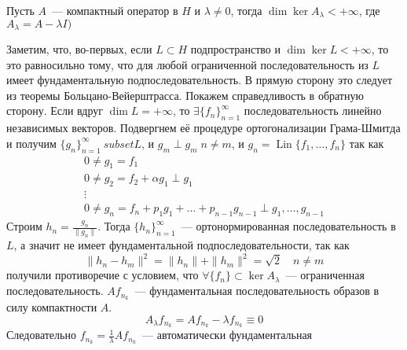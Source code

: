 \documentclass[12pt]{article}
\DeclareMathOperator{\Lin}{Lin}
\begin{document}
\begin{Theor}
    Пусть $A$~--- компактный оператор в $H$ и $\lambda \ne 0$, тогда
    $\dim \ker A_\lambda < +\infty$, где $A_\lambda = A - \lambda I)$
\end{Theor}
\begin{Proof}
    Заметим, что, во-первых, если $L \subset H$ подпространство и $\dim \ker L
    < +\infty$, то это равносильно тому, что для любой ограниченной
    последовательность из $L$ имеет фундаментальную подпоследовательность.
    В прямую сторону это следует из теоремы Больцано-Вейерштрасса.
    Покажем справедливость в обратную сторону.
    Если вдруг $\dim L = +\infty$, то $\exists\{f_n\}_{n = 1}^\infty$
    последовательность линейно независимых векторов.
    Подвергнем её процедуре ортогонализации Грама-Шмитда и получим $\{g_n\}
    _{n = 1}^\infty \ subset L$, и $g_m \perp g_m\; n \ne m$, и $g_n = \Lin
    \{f_1,\dots,f_n\}$ так как
    \begin{gather*}
    0 \ne g_1 = f_1\\
    0 \ne g_2 = f_2 + \alpha g_1 \perp g_1\\
    \vdots\\
    0 \ne g_n = f_n + p_1 g_1 + \dots + p_{n - 1} g_{n - 1} \perp g_1, \dots,
    g_{n - 1}
    \end{gather*}
    Строим $h_n = \frac{g_n}{\|g_n\|}$.
    Тогда $\{h_n\}_{n = 1}^\infty$~--- ортонормированная последовательность в
    $L$, а значит не имеет фундаментальной подпоследовательности, так как
    $$
    \|h_n - h_m\|^2 = \|h_n\| + \|h_m\|^2 = \sqrt{2} \quad n \ne m
    $$
    получили противоречие с условием, что $\forall \{f_n\} \subset \ker A_
    \lambda$~--- ограниченная последовательность.
    $A f_{n_k}$~--- фундаментальная последовательность образов в силу
    компактности $A$.
    $$
    A_\lambda f_{n_k} = A f_{n_k} - \lambda f_{n_k} \equiv 0
    $$
    Следовательно $f_{n_k} = \frac{1}{\lambda}A f_{n_k}$~--- автоматически
    фундаментальная
\end{Proof}
\end{document}
